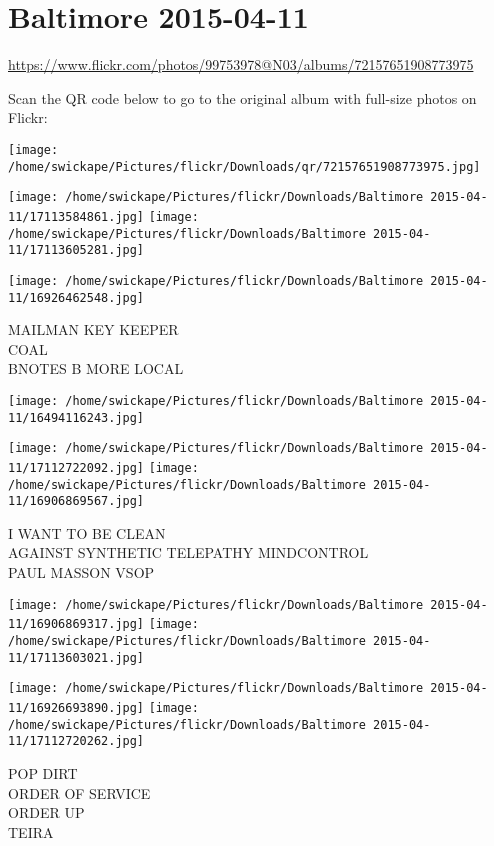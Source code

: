 \documentclass[10pt,letterpaper]{article}
\title{}
\author{}
\date{}
\begin{document}
\section*{Baltimore 2015-04-11}

\url{https://www.flickr.com/photos/99753978@N03/albums/72157651908773975}

Scan the QR code below to go to the original album with full-size photos on Flickr:

\texttt{[image: /home/swickape/Pictures/flickr/Downloads/qr/72157651908773975.jpg]}
\pagebreak

\texttt{[image: /home/swickape/Pictures/flickr/Downloads/Baltimore 2015-04-11/17113584861.jpg]}
\texttt{[image: /home/swickape/Pictures/flickr/Downloads/Baltimore 2015-04-11/17113605281.jpg]}

\texttt{[image: /home/swickape/Pictures/flickr/Downloads/Baltimore 2015-04-11/16926462548.jpg]}

MAILMAN KEY KEEPER\\
COAL\\
BNOTES B MORE LOCAL
\pagebreak

\texttt{[image: /home/swickape/Pictures/flickr/Downloads/Baltimore 2015-04-11/16494116243.jpg]}

\vspace{0.25in}
\texttt{[image: /home/swickape/Pictures/flickr/Downloads/Baltimore 2015-04-11/17112722092.jpg]}
\texttt{[image: /home/swickape/Pictures/flickr/Downloads/Baltimore 2015-04-11/16906869567.jpg]}

I WANT TO BE CLEAN\\
AGAINST SYNTHETIC TELEPATHY MINDCONTROL\\
PAUL MASSON VSOP
\pagebreak

\texttt{[image: /home/swickape/Pictures/flickr/Downloads/Baltimore 2015-04-11/16906869317.jpg]}
\texttt{[image: /home/swickape/Pictures/flickr/Downloads/Baltimore 2015-04-11/17113603021.jpg]}

\texttt{[image: /home/swickape/Pictures/flickr/Downloads/Baltimore 2015-04-11/16926693890.jpg]}
\texttt{[image: /home/swickape/Pictures/flickr/Downloads/Baltimore 2015-04-11/17112720262.jpg]}

POP DIRT\\
ORDER OF SERVICE\\
ORDER UP\\
TEIRA
\pagebreak
\end{document}
